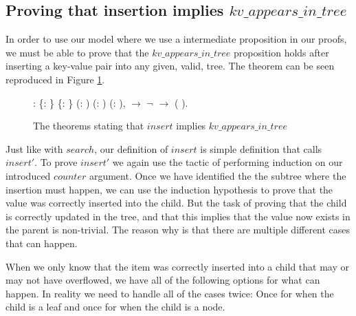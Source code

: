 \subsection{Proving that insertion implies $kv\_appears\_in\_tree$}
\label{sec:proving_insert_appears}

In order to use our model where we use a intermediate proposition in our proofs, we must be able to prove that the $kv\_appears\_in\_tree$ proposition holds after inserting a key-value pair into any given, valid, tree. The theorem can be seen reproduced in Figure \ref{fig:insert_appears}.

\begin{figure}
  \begin{coqdoccode}
  \coqdocnoindent
    : \coqdockw{\ensuremath{\forall}} \{: \} \{: \} (:   ) (: ) (: ),\coqdoceol
  \coqdocindent{1.00em}
      \ensuremath{\rightarrow} \coqdoceol
  \coqdocindent{1.00em}
  \ensuremath{\lnot}   \ensuremath{\rightarrow} \coqdoceol
  \coqdocindent{1.00em}
     (   ).\coqdoceol
  \end{coqdoccode}
  \caption{The theorems stating that $insert$ implies $kv\_appears\_in\_tree$}
  \label{fig:insert_appears}
\end{figure}

Just like with $search$, our definition of $insert$ is simple definition that calls $insert'$. To prove $insert'$ we again use the tactic of performing induction on our introduced $counter$ argument. Once we have identified the the subtree where the insertion must happen, we can use the induction hypothesis to prove that the value was correctly inserted into the child. But the task of proving that the child is correctly updated in the tree, and that this implies that the value now exists in the parent is non-trivial. The reason why is that there are multiple different cases that can happen. 

When we only know that the item was correctly inserted into a child that may or may not have overflowed, we have all of the following options for what can happen. In reality we need to handle all of the cases twice: Once for when the child is a leaf and once for when the child is a node.

